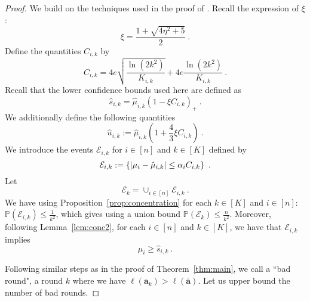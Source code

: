 \begin{proof}
	We build on the techniques used in the proof of . Recall the expression of $\xi$:
	$$
	\xi = \frac{1+\sqrt{4\eta^2+5}}{2}~.
	$$
	Define the quantities $C_{i,k}$ by
	$$
	C_{i,k} = 4e \sqrt{\frac{\ln(2k^2)}{K_{i,k}}}+4e \frac{\ln(2k^2)}{K_{i,k}}~.
	$$
	Recall that the lower confidence bounds used here are defined as
	$$
	\hat{s}_{i,k} = \hat{\mu}_{i,k} \left(1-\xi C_{i,k}\right)_{+}~.
	$$
	We additionally define the following quantities
	\begin{equation*}
		\hat{u}_{i,k} := \hat{\mu}_{i,k} \left(1+\frac{4}{3}\xi C_{i,k}\right)~.
	\end{equation*}
	\noindent We introduce the events $\mathcal{E}_{i,k}$ for $i \in [n]$ and $k \in [K]$ defined by
	$$
	\mathcal{E}_{i,k} := \left\lbrace \left| \mu_i - \hat{\mu}_{i,k} \right| \le \alpha_i C_{i,k}\right\rbrace~.
	$$
	Let 
	$$
	\mathcal{E}_k = \cup_{i \in [n]} \mathcal{E}_{i,k}~.
	$$
	We have using Proposition~\ref{prop:concentration} for each $k \in [K]$ and $i \in [n]$: $\mathbb{P}\left(\mathcal{E}_{i,k}\right) \le \frac{1}{k^2}$, which gives using a union bound $\mathbb{P}(\mathcal{E}_k) \le \frac{n}{k^2}$. 
	Moreover, following Lemma~\ref{lem:conc2}, for each $i \in [n]$ and $k \in [K]$, we have that $\mathcal{E}_{i,k}$ implies
	\begin{equation}\label{eq:lcb}
		\mu_i \ge \hat{s}_{i,k}~.
	\end{equation}
	
	\noindent Following similar steps as in the proof of Theorem~\ref{thm:main}, we call a ``bad round", a round $k$ where we have $\ell(\bm{a}_{k}) > \ell(\bar{\bm{a}})$. Let us upper bound the number of bad rounds. 
	

\end{proof}
